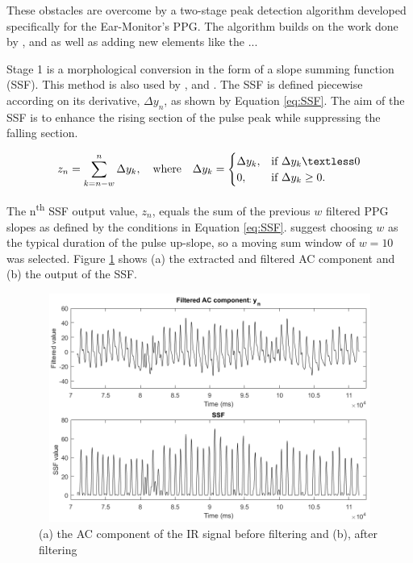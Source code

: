\medskip

These obstacles are overcome by a two-stage peak detection algorithm developed specifically for the Ear-Monitor's PPG. The algorithm builds on the work done by \cite{park2015wearable}, \cite{zong2003open} and \cite{elgendi2013systolic} as well as adding new elements like the ...

\medskip

Stage 1 is a morphological conversion in the form of a slope summing function (SSF). This method is also used by \cite{zong2003open}, \cite{park2015wearable} and \cite{elgendi2013systolic}. The SSF is defined piecewise according on its derivative, $\Delta y_n$,  as shown by Equation \ref{eq:SSF}. The aim of the SSF is to enhance the rising section of the pulse peak while suppressing the falling section.

\begin{equation}
\label{eq:SSF}
z_n = \sum\limits_{k=n-w}^n \Delta y_k, \quad \text{where} \quad \Delta y_k=
\begin{cases}
\Delta y_k, 	&\text{if } \Delta y_k \textless	0 \\
0, 				&\text{if } \Delta y_k \geq			0. 
\end{cases}
\end{equation}

The n\textsuperscript{th} SSF output value, $z_n$,  equals the sum of the previous $w$ filtered PPG slopes as defined by the conditions in Equation \ref{eq:SSF}. \cite{zong2003open} suggest choosing $w$ as the typical duration of the pulse up-slope, so a moving sum window of $w=10$ was selected. Figure \ref{fig:SSF} shows (a) the extracted  and filtered AC component and (b) the output of the SSF.

\begin{figure}[H]
   \centering
   \includegraphics[width=12cm,height=7.5cm]{figs/SSF.png}
   \caption{(a) the AC component of the IR signal before filtering and (b), after filtering}
   \label{fig:SSF}
\end{figure}

